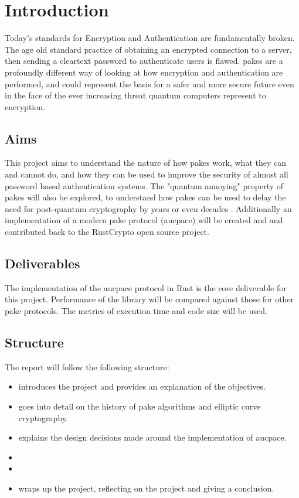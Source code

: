 \chapter{Introduction}
\label{chap:intro}

Today's standards for Encryption and Authentication are fundamentally broken.
The age old standard practice of obtaining an encrypted connection to a server, then sending a cleartext password to authenticate users is flawed.
\glspl{pake} are a profoundly different way of looking at how encryption and authentication are performed, and could represent the basis for a safer and more secure future even in the face of the ever increasing threat quantum computers represent to encryption.

\section{Aims}
This project aims to understand the nature of how \glspl{pake} work, what they can and cannot do, and how they can be used to improve the security of almost all password based authentication systems.
The "quantum annoying" property of \glspl{pake} will also be explored, to understand how \glspl{pake} can be used to delay the need for post-quantum cryptography by years or even decades \cite{quantum-annoying}.
Additionally an implementation of a modern \gls{pake} protocol (\gls{aucpace}) will be created and and contributed back to the RustCrypto open source project.

\section{Deliverables}
The implementation of the \gls{aucpace} protocol in Rust is the core deliverable for this project.
Performance of the library will be compared against those for other \gls{pake} protocols.
The metrics of execution time and code size will be used.

\section{Structure}
The report will follow the following structure:
\begin{itemize}
    \item{ introduces the project and provides an explanation of the objectives.}
    \item{ goes into detail on the history of \gls{pake} algorithms and elliptic curve cryptography.}
    \item{ explains the design decisions made around the implementation of \gls{aucpace}.}
    \item{}
    \item{}
    \item{ wraps up the project, reflecting on the project and giving a conclusion.}
\end{itemize}
